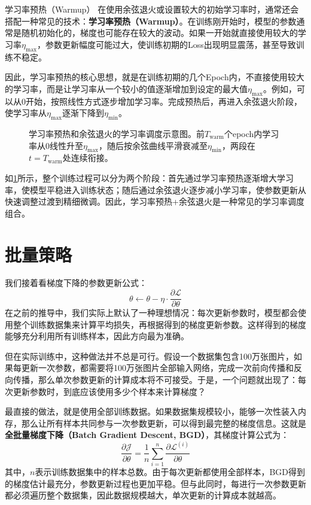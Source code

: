 \begin{purpleBox}{学习率预热（Warmup）}
在使用余弦退火或设置较大的初始学习率时，通常还会搭配一种常见的技术：\textbf{学习率预热（Warmup）}。在训练刚开始时，模型的参数通常是随机初始化的，梯度也可能存在较大的波动。如果一开始就直接使用较大的学习率$\eta_{\max}$，参数更新幅度可能过大，使训练初期的Loss出现明显震荡，甚至导致训练不稳定。

因此，学习率预热的核心思想，就是在训练初期的几个Epoch内，不直接使用较大的学习率，而是让学习率从一个较小的值逐渐增加到设定的最大值$\eta_{\max}$。例如，可以从$0$开始，按照线性方式逐步增加学习率。完成预热后，再进入余弦退火阶段，使学习率从$\eta_{\max}$逐渐下降到$\eta_{\min}$。

\begin{figure}[H]
    \caption{学习率预热和余弦退火的学习率调度示意图。前$T_{\text{warm}}$个epoch内学习率从$0$线性升至$\eta_{\max}$，随后按余弦曲线平滑衰减至$\eta_{\min}$，两段在$t=T_{\text{warm}}$处连续衔接。}
    \label{fig:warmup}
\end{figure}

如\cref{fig:warmup}所示，整个训练过程可以分为两个阶段：首先通过学习率预热逐渐增大学习率，使模型平稳进入训练状态；随后通过余弦退火逐步减小学习率，使参数更新从快速调整过渡到精细微调。因此，学习率预热+余弦退火是一种常见的学习率调度组合。
\end{purpleBox}

\section{批量策略}

我们接着看梯度下降的参数更新公式：
$$
\theta \leftarrow \theta - \eta \cdot \frac{\partial \mathcal{L}}{\partial \theta}
$$
在之前的推导中，我们实际上默认了一种理想情况：每次更新参数时，模型都会使用整个训练数据集来计算平均损失，再根据得到的梯度更新参数。这样得到的梯度能够充分利用所有训练样本，因此方向最为准确。

但在实际训练中，这种做法并不总是可行。假设一个数据集包含100万张图片，如果每更新一次参数，都需要将100万张图片全部输入网络，完成一次前向传播和反向传播，那么单次参数更新的计算成本将不可接受。于是，一个问题就出现了：每次更新参数时，到底应该使用多少个样本来计算梯度？

最直接的做法，就是使用全部训练数据。如果数据集规模较小，能够一次性装入内存，那么让所有样本共同参与一次参数更新，可以得到最完整的梯度信息。这就是\textbf{全批量梯度下降（Batch Gradient Descent, BGD）}，其梯度计算公式为：
$$
\frac{\partial \mathcal{J}}{\partial \theta} = \frac{1}{n} \sum_{i=1}^{n} \frac{\partial \mathcal{L}^{(i)}}{\partial \theta}
$$
其中，$n$表示训练数据集中的样本总数。由于每次更新都使用全部样本，BGD得到的梯度估计最充分，参数更新过程也更加平稳。但与此同时，每进行一次参数更新都必须遍历整个数据集，因此数据规模越大，单次更新的计算成本就越高。

